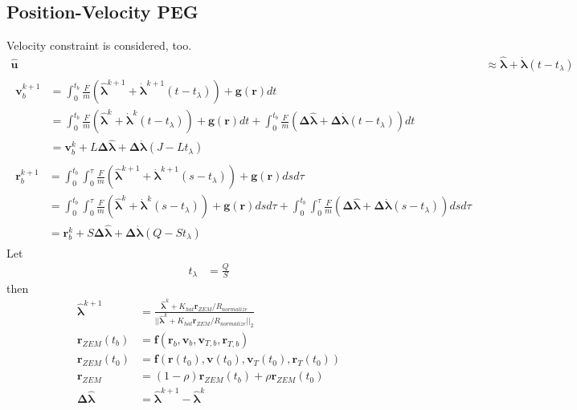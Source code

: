 \documentclass{fdclreport}
\begin{document}
\subsection{Position-Velocity PEG}
Velocity constraint is considered, too.
\begin{align}
	\bm{\hat{u}} &\approx \bm{\hat{\lambda}} + \bm{\dot{\lambda}}(t-t_{\lambda}) \\
\begin{split}
	\bm{v}_b^{k+1} &= \int_{0}^{t_b} \frac{F}{m} (\bm{\hat{\lambda}}^{k+1} + \bm{\dot{\lambda}}^{k+1}(t-t_{\lambda}) )+ \bm{g}(\bm{r}) dt \\
								 &= \int_{0}^{t_b} \frac{F}{m} (\bm{\hat{\lambda}}^{k} + \bm{\dot{\lambda}}^{k}(t-t_{\lambda}) )+ \bm{g}(\bm{r}) dt	+ \int_{0}^{t_b} \frac{F}{m} (\bm{\Delta \hat{\lambda}} + \bm{\Delta \dot{\lambda}}(t-t_{\lambda}))dt\\
								 &= \bm{v}_b^{k} + L \bm{\Delta \hat{\lambda}} + \bm{\Delta \dot{\lambda}} (J - L t_{\lambda})
\end{split} \\
\begin{split}
	\bm{r}_b^{k+1} &= \int_{0}^{t_b} \int_{0}^{\tau} \frac{F}{m} (\bm{\hat{\lambda}}^{k+1} + \bm{\dot{\lambda}}^{k+1}(s-t_{\lambda})) + \bm{g}(\bm{r}) ds d\tau \\
								 &= \int_{0}^{t_b} \int_{0}^{\tau} \frac{F}{m} (\bm{\hat{\lambda}}^{k} + \bm{\dot{\lambda}}^{k}(s-t_{\lambda}) ) + \bm{g}(\bm{r}) ds d\tau + \int_{0}^{t_b} \int_{0}^{\tau} \frac{F}{m} (\bm{\Delta \hat{\lambda}} + \bm{\Delta \dot{\lambda}}(s-t_{\lambda}))ds d\tau\\
								 &= \bm{r}_b^{k} + S \bm{\Delta \hat{\lambda}} + \bm{\Delta \dot{\lambda}} (Q-St_{\lambda})
\end{split}
\end{align}
Let
\begin{align}
	t_{\lambda} &= \frac{Q}{S}
\end{align}
then
\begin{align}
	\bm{\hat{\lambda}}^{k+1} &= \frac{\bm{\hat{\lambda}}^{k} + K_{hat} \bm{r}_{ZEM}/R_{normalize}}{||\bm{\hat{\lambda}}^{k} + K_{hat} \bm{r}_{ZEM}/R_{normalize}||_2} \\
	\bm{r}_{ZEM}(t_b) &= \bm{f}(\bm{r}_b, \bm{v}_b, \bm{v}_{T,b}, \bm{r}_{T,b}) \\
	\bm{r}_{ZEM}(t_0) &= \bm{f}(\bm{r}(t_0), \bm{v}(t_0), \bm{v}_T(t_0), \bm{r}_T(t_0)) \\
	\bm{r}_{ZEM} &= (1-\rho) \bm{r}_{ZEM}(t_b) + \rho \bm{r}_{ZEM}(t_0) \\
	\bm{\Delta \hat{\lambda}} &= \bm{\hat{\lambda}}^{k+1} - \bm{\hat{\lambda}}^k
\end{align}
\end{document}
